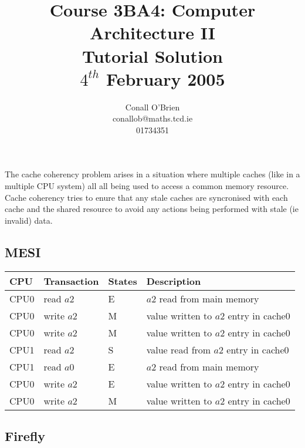 \documentclass[a4paper,12pt]{article}
\begin{document}
\title{Course 3BA4: Computer Architecture II \\ Tutorial Solution\\$4^{th}$ February 2005}

\author{Conall O'Brien \\ conallob@maths.tcd.ie \\ 01734351}

\maketitle

\section{}

The cache coherency problem arises in a situation where multiple caches
(like in a multiple CPU system) all all being used to access a common
memory resource. Cache coherency tries to enure that any stale caches
are syncronised with each cache and the shared resource to avoid any
actions being performed with stale (ie invalid) data.


\subsection*{MESI}

\begin{tabular}{|l|l|l|l|}
\hline
CPU	&	Transaction	&	States	&	Description	\\
\hline
CPU0	&	read $a2$	&	E			&	$a2$ read from main memory						\\
\hline
CPU0	&	write $a2$	&	M			&	value written to $a2$ entry in cache0		\\
\hline
CPU0	&	write $a2$	&	M			&	value written to $a2$ entry in cache0		\\
\hline
CPU1	&	read $a2$	&	S			&	value read from $a2$ entry in cache0		\\
\hline
CPU1	&	read $a0$	&	E			&	$a2$ read from main memory						\\
\hline
CPU0	&	write $a2$	&	E			&	value written to $a2$ entry in cache0		\\
\hline
CPU0	&	write $a2$	&	M			&	value written to $a2$ entry in cache0		\\
\hline
\end{tabular}


\subsection*{Firefly}
\end{document}
